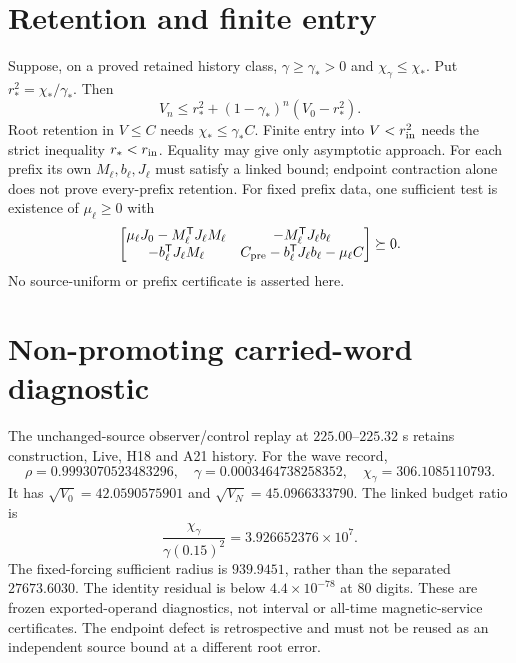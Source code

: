 \documentclass[11pt]{article}
\begin{document}
\section{Retention and finite entry}
Suppose, on a proved retained history class, $\gamma\ge\gamma_*>0$ and
$\chi_\gamma\le\chi_*$. Put $r_*^2=\chi_*/\gamma_*$. Then
\[
 V_n\le r_*^2+(1-\gamma_*)^n(V_0-r_*^2).
\]
Root retention in $V\le C$ needs $\chi_*\le\gamma_*C$.
Finite entry into $V<r_{\rm in}^2$ needs the strict inequality
$r_*<r_{\rm in}$. Equality may give only asymptotic approach.
For each prefix its own $M_\ell,b_\ell,J_\ell$ must satisfy a linked bound;
endpoint contraction alone does not prove every-prefix retention.
For fixed prefix data, one sufficient test is existence of $\mu_\ell\ge0$
with
\[
\begin{bmatrix}
 \mu_\ell J_0-M_\ell^{\mathsf T}J_\ell M_\ell &-M_\ell^{\mathsf T}J_\ell b_\ell\\
 -b_\ell^{\mathsf T}J_\ell M_\ell &C_{\rm pre}-b_\ell^{\mathsf T}J_\ell b_\ell-\mu_\ell C
\end{bmatrix}\succeq0.
\]
No source-uniform or prefix certificate is asserted here.

\section{Non-promoting carried-word diagnostic}
The unchanged-source observer/control replay at $225.00$--$225.32$ s
retains construction, Live, H18 and A21 history. For the wave record,
\[
 \rho=0.9993070523483296,\quad
 \gamma=0.0003464738258352,\quad
 \chi_\gamma=306.1085110793.
\]
It has $\sqrt{V_0}=42.0590575901$ and $\sqrt{V_N}=45.0966333790$.
The linked budget ratio is
\[
 \frac{\chi_\gamma}{\gamma(0.15)^2}=3.926652376\times10^7.
\]
The fixed-forcing sufficient radius is $939.9451$, rather than the separated
$27673.6030$. The identity residual is below $4.4\times10^{-78}$ at 80 digits.
These are frozen exported-operand diagnostics, not interval or all-time
magnetic-service certificates. The endpoint defect is retrospective and must
not be reused as an independent source bound at a different root error.
\end{document}
